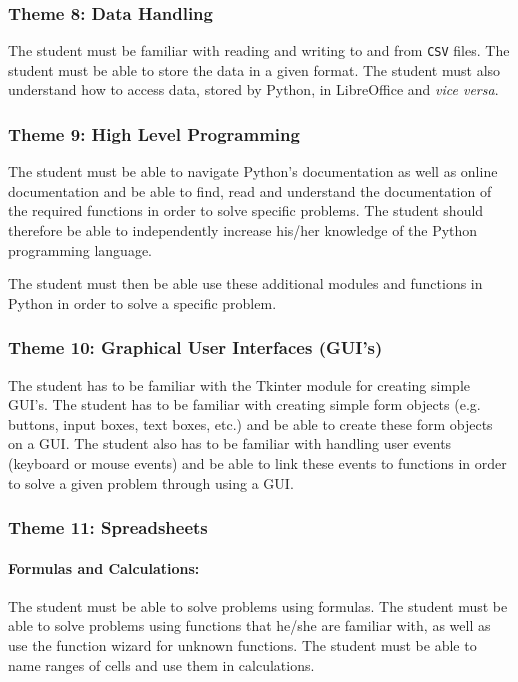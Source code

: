        \subsubsection{Theme 8: Data Handling}
        The student must be familiar with reading and writing to and
        from \texttt{CSV} files.%
        The student must be able to store the data in a given
        format. The student must also understand how to access data,
        stored by Python, in LibreOffice and \textit{vice versa}.

        \subsubsection{Theme 9: High Level Programming}
                The student must be able to navigate Python's documentation
                as well as online documentation and be able to find, read and
                understand the documentation of the required functions in order
                to solve specific problems. The student should therefore be
                able to independently increase his/her knowledge of the Python
                programming language.

                The student must then be able use these additional modules and
                functions in Python in order to solve a specific problem.

        \subsubsection{Theme 10: Graphical User Interfaces (GUI's)}
            The student has to be familiar with the Tkinter module for creating
            simple GUI's. The student has to be familiar with creating simple
            form objects (e.g. buttons, input boxes, text boxes, etc.) and be
            able to create these form objects on a GUI. The student also has to
            be familiar with handling user events (keyboard or mouse events)
            and be able to link these events to functions in order to solve
            a given problem through using a GUI.

        \subsubsection{Theme 11: Spreadsheets}
            \paragraph{Formulas and Calculations:}
                The student must be able to solve problems using formulas. The
                student must be able to solve problems using functions that he/she
                are familiar with, as well as use the function wizard for unknown
                functions. The student must be able to name ranges of cells and use
                them in calculations.

